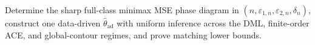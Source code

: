 Determine the sharp full-class minimax MSE phase diagram in \((n,\varepsilon_{1,n},\varepsilon_{2,n},\delta_n)\), construct one data-driven \(\widehat\theta_{\mathrm{ad}}\) with uniform inference across the DML, finite-order ACE, and global-contour regimes, and prove matching lower bounds.